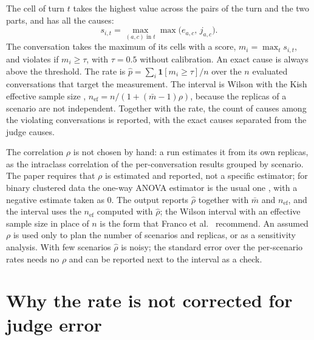 \documentclass[11pt,a4paper]{article}
\begin{document}
The cell of turn $t$ takes the highest value across the pairs of the turn and the two parts, and has all the
causes:
\begin{equation}
  s_{i,t} = \max_{(a,c) \text{ in } t} \max\big(e_{a,c},\, j_{a,c}\big).
\end{equation}
The conversation takes the maximum of its cells with a score, $m_i = \max_t s_{i,t}$, and violates if
$m_i \geq \tau$, with $\tau = 0.5$ without calibration. An exact cause is always above the threshold. The rate is
$\hat{p} = \sum_i \mathbf{1}[m_i \geq \tau] / n$ over the $n$ evaluated conversations that target the
measurement. The interval is Wilson \cite{wilson1927,brown2001} with the Kish effective sample size
\cite{kish1965}, $n_{\mathrm{ef}} = n / (1 + (\bar{m} - 1)\rho)$, because the replicas of a scenario are not
independent. Together with the rate, the count of causes among the violating conversations is reported, with
the exact causes separated from the judge causes.

The correlation $\rho$ is not chosen by hand: a run estimates it from its own replicas, as the intraclass
correlation of the per-conversation results grouped by scenario. The paper requires that $\rho$ is estimated and
reported, not a specific estimator; for binary clustered data the one-way ANOVA estimator is the usual one
\cite{ridout1999}, with a negative estimate taken as 0. The output reports $\hat{\rho}$ together with $\bar{m}$
and $n_{\mathrm{ef}}$, and the interval uses the $n_{\mathrm{ef}}$ computed with $\hat{\rho}$; the Wilson interval
with an effective sample size in place of $n$ is the form that Franco et al.~\cite{franco2019} recommend. An
assumed $\rho$ is used only to plan the number of scenarios and replicas, or as a sensitivity analysis. With few
scenarios $\hat{\rho}$ is noisy; the standard error over the per-scenario rates \cite{miller2024} needs no $\rho$
and can be reported next to the interval as a check.

\section{Why the rate is not corrected for judge error}
\label{sec:rg}
\end{document}
